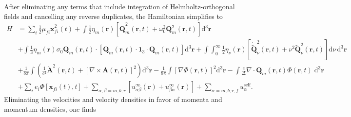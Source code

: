 \documentclass{article}
\begin{document}
After eliminating any terms that include integration of Helmholtz-orthogonal fields and cancelling any reverse duplicates, the Hamiltonian simplifies to
\begin{equation}
\begin{split}
H &= \sum_i\frac{1}{2}\mu_{fi}\dot{\mathbf{x}}_{fi}^2(t) + \int\frac{1}{2}\eta_m(\mathbf{r})\left[\dot{\mathbf{Q}}_m^2(\mathbf{r},t) + \omega_0^2\mathbf{Q}_m^2(\mathbf{r},t)\right]\mathrm{d}^3\mathbf{r}\\
&+ \int\frac{1}{3}\eta_m(\mathbf{r})\sigma_0 \mathbf{Q}_m(\mathbf{r},t)\cdot\left[\mathbf{Q}_m(\mathbf{r},t)\cdot\bm{1}_3\cdot\mathbf{Q}_m(\mathbf{r},t)\right]\mathrm{d}^3\mathbf{r} + \int\int_0^\infty\frac{1}{2}\eta_\nu(\mathbf{r})\left[\dot{\tilde{\mathbf{Q}}}_\nu^2(\mathbf{r},t) + \nu^2\tilde{\mathbf{Q}}_\nu^2(\mathbf{r},t)\right]\mathrm{d}\nu\,\mathrm{d}^3\mathbf{r}\\
&+ \frac{1}{8\pi}\int\left(\frac{1}{c^2}\dot{\mathbf{A}}^2(\mathbf{r},t) + \left[\nabla\times\mathbf{A}(\mathbf{r},t)\right]^2\right)\mathrm{d}^3\mathbf{r} - \frac{1}{8\pi}\int\left[\nabla\Phi(\mathbf{r},t)\right]^2\mathrm{d}^3\mathbf{r} - \int\frac{e}{\Delta}\nabla\cdot\mathbf{Q}_m(\mathbf{r},t)\Phi(\mathbf{r},t)\;\mathrm{d}^3\mathbf{r}\\
&+ \sum_ie_i\Phi[\mathbf{x}_{fi}(t),t] + \sum_{\alpha,\beta = m,b,r}\left[u_{\alpha\beta}^\infty(\mathbf{r}) + u_{\beta\alpha}^\infty(\mathbf{r})\right] + \sum_{\alpha = m,b,r,f}u_\alpha^\mathrm{self}.
\end{split}
\end{equation}
Eliminating the velocities and velocity densities in favor of momenta and momentum densities, one finds
\end{document}
